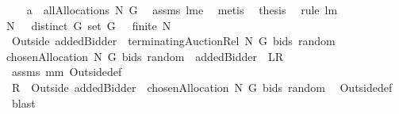 \begin{isabellebody}
%
\isadelimproof
%
\endisadelimproof
%
\isatagproof
{}\isamarkupfalse%
\ {\isacharminus}\ \isamarkupfalse%
\ {\isachardoublequoteopen}a\ {\isasymin}\ allAllocations{\isacharprime}{\isacharprime}{\isacharprime}{\isacharprime}\ N\ G{\isachardoublequoteclose}\ \isamarkupfalse%
\ assms\ lm{}{}e\ \isamarkupfalse%
\ metis\ \isamarkupfalse%
\ {\isacharquery}thesis\ \isamarkupfalse%
\ {\isacharparenleft}rule\ lm{}{}{\isacharparenright}\ \isamarkupfalse%
%
\endisatagproof
{\isafoldproof}%
%
\isadelimproof
\isanewline
%
\endisadelimproof
\isanewline
{}\isamarkupfalse%
\ \ \isanewline
{\isachardoublequoteopen}N\ {\isasymnoteq}\ {\isacharbraceleft}{\isacharbraceright}{\isachardoublequoteclose}\ {\isachardoublequoteopen}distinct\ G{\isachardoublequoteclose}\ {\isachardoublequoteopen}set\ G\ {\isasymnoteq}\ {\isacharbraceleft}{\isacharbraceright}{\isachardoublequoteclose}\ {\isachardoublequoteopen}finite\ N{\isachardoublequoteclose}\ \ \isanewline
{}\ {\isachardoublequoteopen}{\isacharparenleft}Outside{\isacharprime}\ {\isacharbraceleft}addedBidder{\isacharprime}{\isacharbraceright}{\isacharparenright}\ {\isacharbackquote}\ {\isacharparenleft}terminatingAuctionRel\ N\ G\ {\isacharparenleft}bids{\isacharparenright}\ random{\isacharparenright}\ {\isacharequal}\ \isanewline
{\isacharbraceleft}chosenAllocation{\isacharprime}\ N\ G\ bids\ random\ {\isacharminus}{\isacharminus}\ {\isacharparenleft}addedBidder{\isacharprime}{\isacharparenright}{\isacharbraceright}{\isachardoublequoteclose}\ {\isacharparenleft}\ {\isachardoublequoteopen}{\isacharquery}L{\isacharequal}{\isacharquery}R{\isachardoublequoteclose}{\isacharparenright}%
\isadelimproof
\ %
\endisadelimproof
%
\isatagproof
{}\isamarkupfalse%
\ assms\ mm{}{}\ Outside{\isacharunderscore}def\ \isanewline
{}\isamarkupfalse%
\ {\isacharminus}\isanewline
{}\isamarkupfalse%
\ {\isachardoublequoteopen}{\isacharquery}R\ {\isacharequal}\ Outside{\isacharprime}\ {\isacharbraceleft}addedBidder{\isacharprime}{\isacharbraceright}\ {\isacharbackquote}\ {\isacharbraceleft}chosenAllocation{\isacharprime}\ N\ G\ bids\ random{\isacharbraceright}{\isachardoublequoteclose}\ \isamarkupfalse%
\ Outside{\isacharunderscore}def\ \isanewline
{}\isamarkupfalse%
\ blast\ \isanewline
{}\isamarkupfalse%

\end{isabellebody}
